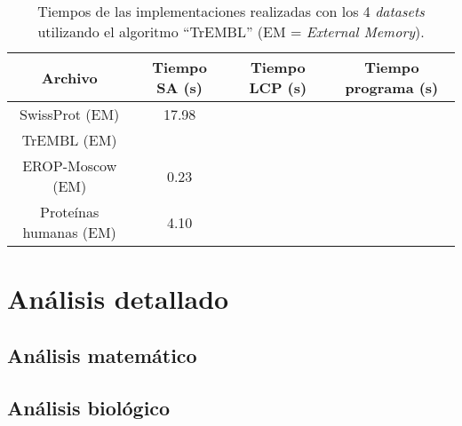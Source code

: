 \begin{table}[h]
\centering
\label{my-labelr4}
\begin{tabular}{|c|c|c|c|}
\hline
\textbf{Archivo}  & \textbf{Tiempo SA (s)} & \textbf{Tiempo LCP (s)} & \textbf{Tiempo programa (s)} \\ \hline
SwissProt (EM)        &  17.98               &                    &                          \\
TrEMBL (EM)           &                 &                 &                          \\
EROP-Moscow (EM)      & 0.23                   &                     &                          \\
Proteínas humanas (EM) & 4.10                 &                     &                          \\ \hline
\end{tabular}
\caption{Tiempos de las implementaciones realizadas con los 4 \textit{datasets} utilizando el algoritmo ``TrEMBL'' (EM = \textit{External Memory}).}
\end{table}

\section{Análisis detallado}

\subsection{Análisis matemático}

\subsection{Análisis biológico}
